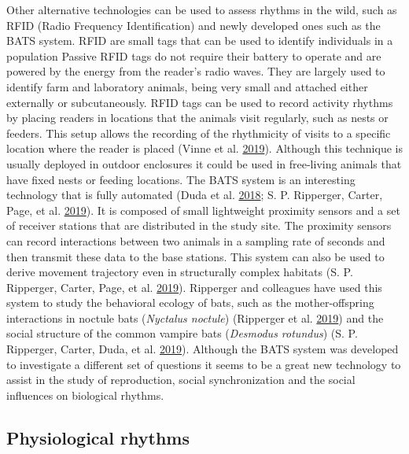 \documentclass[msc,numbers,hidelinks]{coppe}
\begin{document}
  Other alternative technologies can be used to assess rhythms in the wild, such as RFID (Radio Frequency Identification) and newly developed ones such as the BATS system. RFID are small tags that can be used to identify individuals in a population Passive RFID tags do not require their battery to operate and are powered by the energy from the reader's radio waves. They are largely used to identify farm and laboratory animals, being very small and attached either externally or subcutaneously. RFID tags can be used to record activity rhythms by placing readers in locations that the animals visit regularly, such as nests or feeders. This setup allows the recording of the rhythmicity of visits to a specific location where the reader is placed (Vinne et al. \protect\hyperlink{ref-vinneMaximisingSurvivalShifting2019}{2019}). Although this technique is usually deployed in outdoor enclosures it could be used in free-living animals that have fixed nests or feeding locations. The BATS system is an interesting technology that is fully automated (Duda et al. \protect\hyperlink{ref-dudaBATSAdaptiveUltra2018}{2018}; S. P. Ripperger, Carter, Page, et al. \protect\hyperlink{ref-rippergerThinkingSmallNextgeneration2019}{2019}). It is composed of small lightweight proximity sensors and a set of receiver stations that are distributed in the study site. The proximity sensors can record interactions between two animals in a sampling rate of seconds and then transmit these data to the base stations. This system can also be used to derive movement trajectory even in structurally complex habitats (S. P. Ripperger, Carter, Page, et al. \protect\hyperlink{ref-rippergerThinkingSmallNextgeneration2019}{2019}). Ripperger and colleagues have used this system to study the behavioral ecology of bats, such as the mother-offspring interactions in noctule bats (\emph{Nyctalus noctule}) (Ripperger et al. \protect\hyperlink{ref-rippergerProximitySensorsCommon2019}{2019}) and the social structure of the common vampire bats (\emph{Desmodus rotundus}) (S. P. Ripperger, Carter, Duda, et al. \protect\hyperlink{ref-rippergerVampireBatsThat2019}{2019}). Although the BATS system was developed to investigate a different set of questions it seems to be a great new technology to assist in the study of reproduction, social synchronization and the social influences on biological rhythms.

  \hypertarget{physiological-rhythms}{%
  \subsection{Physiological rhythms}\label{physiological-rhythms}}
\end{document}
